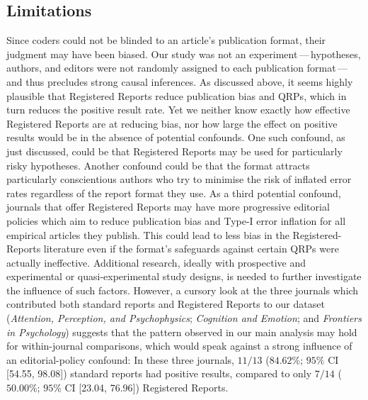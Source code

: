 \documentclass[british,,jou,floatsintext]{apa6}
\begin{document}
\hypertarget{limitations}{%
\subsection{Limitations}\label{limitations}}

Since coders could not be blinded to an article's publication format, their judgment may have been biased.
Our study was not an experiment\(\,\)---\(\,\)hypotheses, authors, and editors were not randomly assigned to each publication format\(\,\)---\(\,\)and thus precludes strong causal inferences.
As discussed above, it seems highly plausible that Registered Reports reduce publication bias and QRPs, which in turn reduces the positive result rate.
Yet we neither know exactly how effective Registered Reports are at reducing bias, nor how large the effect on positive results would be in the absence of potential confounds.
One such confound, as just discussed, could be that Registered Reports may be used for particularly risky hypotheses.
Another confound could be that the format attracts particularly conscientious authors who try to minimise the risk of inflated error rates regardless of the report format they use.
As a third potential confound, journals that offer Registered Reports may have more progressive editorial policies which aim to reduce publication bias and Type-I error inflation for all empirical articles they publish.
This could lead to less bias in the Registered-Reports literature even if the format's safeguards against certain QRPs were actually ineffective.
Additional research, ideally with prospective and experimental or quasi-experimental study designs, is needed to further investigate the influence of such factors.
However, a cursory look at the three journals which contributed both standard reports and Registered Reports to our dataset (\emph{Attention, Perception, and Psychophysics}; \emph{Cognition and Emotion}; and \emph{Frontiers in Psychology}) suggests that the pattern observed in our main analysis may hold for within-journal comparisons, which would speak against a strong influence of an editorial-policy confound:
In these three journals, \(11/13\) (\(84.62\%\); \(95 \%\) CI {[}54.55, 98.08{]}) standard reports had positive results, compared to only \(7/14\) (\(50.00\%\); \(95 \%\) CI {[}23.04, 76.96{]}) Registered Reports.
\end{document}
